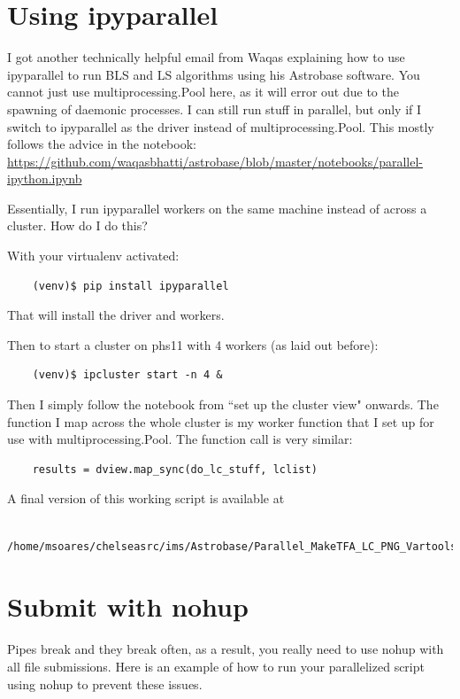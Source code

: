 \documentclass[11pt,letterpaper]{book} %
\begin{document}
\section*{Using ipyparallel}
I got another technically helpful email from Waqas explaining how to use ipyparallel to run BLS and LS algorithms using his Astrobase software. You cannot just use multiprocessing.Pool here, as it will error out due to the spawning of daemonic processes. 
I can still run stuff in parallel, but only if I switch
to ipyparallel as the driver instead of multiprocessing.Pool. This
mostly follows the advice in the notebook:
\url{https://github.com/waqasbhatti/astrobase/blob/master/notebooks/parallel-ipython.ipynb}

Essentially, I run ipyparallel workers on the same machine instead of across a cluster. How do I do this?

With your virtualenv activated:
\begin{verbatim}
    (venv)$ pip install ipyparallel
\end{verbatim}
That will install the driver and workers.

Then to start a cluster on phs11 with 4 workers (as laid out before):
\begin{verbatim}
    (venv)$ ipcluster start -n 4 &
\end{verbatim}

Then I simply follow the notebook from ``set up the cluster view" onwards.
The function I map across the whole cluster is my
worker function that I set up for use with multiprocessing.Pool. The function call is very similar:

\begin{verbatim}
    results = dview.map_sync(do_lc_stuff, lclist)
\end{verbatim}

A final version of this working script is available at 
\begin{verbatim}
    /home/msoares/chelseasrc/ims/Astrobase/Parallel_MakeTFA_LC_PNG_Vartools.py
\end{verbatim}

\section*{Submit with nohup}
Pipes break and they break often, as a result, you really need to use nohup with all file submissions. Here is an example of how to run your parallelized script using nohup to prevent these issues.
\end{document}
